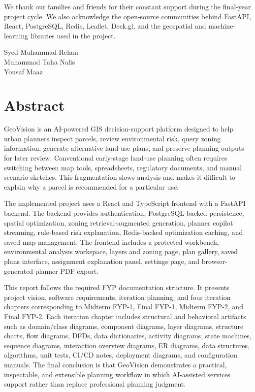 \documentclass[12pt,a4paper,oneside]{report}
\begin{document}
We thank our families and friends for their constant support during the final-year project cycle. We also acknowledge the open-source communities behind FastAPI, React, PostgreSQL, Redis, Leaflet, Deck.gl, and the geospatial and machine-learning libraries used in the project.

\vspace{0.8cm}
Syed Muhammad Rehan\\
Muhammad Taha Nafis\\
Yousaf Maaz

\chapter*{Abstract}
GeoVision is an AI-powered GIS decision-support platform designed to help urban planners inspect parcels, review environmental risk, query zoning information, generate alternative land-use plans, and preserve planning outputs for later review. Conventional early-stage land-use planning often requires switching between map tools, spreadsheets, regulatory documents, and manual scenario sketches. This fragmentation slows analysis and makes it difficult to explain why a parcel is recommended for a particular use.

The implemented project uses a React and TypeScript frontend with a FastAPI backend. The backend provides authentication, PostgreSQL-backed persistence, spatial optimization, zoning retrieval-augmented generation, planner copilot streaming, rule-based risk explanation, Redis-backed optimization caching, and saved map management. The frontend includes a protected workbench, environmental analysis workspace, layers and zoning page, plan gallery, saved plans interface, assignment explanation panel, settings page, and browser-generated planner PDF export.

This report follows the required FYP documentation structure. It presents project vision, software requirements, iteration planning, and four iteration chapters corresponding to Midterm FYP-1, Final FYP-1, Midterm FYP-2, and Final FYP-2. Each iteration chapter includes structural and behavioral artifacts such as domain/class diagrams, component diagrams, layer diagrams, structure charts, flow diagrams, DFDs, data dictionaries, activity diagrams, state machines, sequence diagrams, interaction overview diagrams, ER diagrams, data structures, algorithms, unit tests, CI/CD notes, deployment diagrams, and configuration manuals. The final conclusion is that GeoVision demonstrates a practical, inspectable, and extensible planning workflow in which AI-assisted services support rather than replace professional planning judgment.
\end{document}
